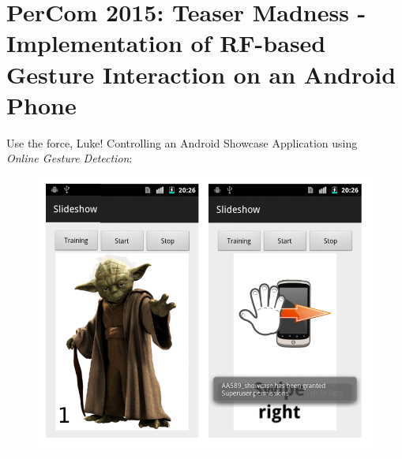 \documentclass{beamer}
\begin{document}
\section{PerCom 2015: Teaser Madness - Implementation of RF-based Gesture Interaction on an Android Phone}




\begin{frame}{Use the force, Luke!}
Controlling an Android Showcase Application using \\ \emph{Online Gesture Detection}:
 \begin{figure}
 \centering
\includegraphics[width=0.75\linewidth]{./pics/showcaseApp.png}
\label{fig:ushahidi}
\end{figure}
\end{frame}
\end{document}

